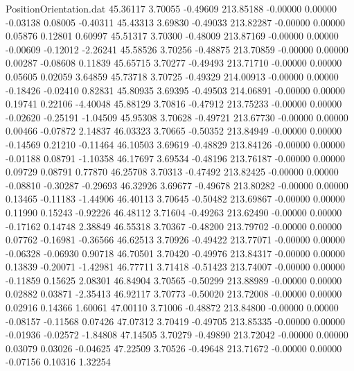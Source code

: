 \begin{filecontents}{PositionOrientation.dat}
  45.36117    3.70055   -0.49609   213.85188   -0.00000    0.00000   -0.03138    0.08005   -0.40311
  45.43313    3.69830   -0.49033   213.82287   -0.00000    0.00000    0.05876    0.12801    0.60997
  45.51317    3.70300   -0.48009   213.87169   -0.00000    0.00000   -0.00609   -0.12012   -2.26241
  45.58526    3.70256   -0.48875   213.70859   -0.00000    0.00000    0.00287   -0.08608    0.11839
  45.65715    3.70277   -0.49493   213.71710   -0.00000    0.00000    0.05605    0.02059    3.64859
  45.73718    3.70725   -0.49329   214.00913   -0.00000    0.00000   -0.18426   -0.02410    0.82831
  45.80935    3.69395   -0.49503   214.06891   -0.00000    0.00000    0.19741    0.22106   -4.40048
  45.88129    3.70816   -0.47912   213.75233   -0.00000    0.00000   -0.02620   -0.25191   -1.04509
  45.95308    3.70628   -0.49721   213.67730   -0.00000    0.00000    0.00466   -0.07872    2.14837
  46.03323    3.70665   -0.50352   213.84949   -0.00000    0.00000   -0.14569    0.21210   -0.11464
  46.10503    3.69619   -0.48829   213.84126   -0.00000    0.00000   -0.01188    0.08791   -1.10358
  46.17697    3.69534   -0.48196   213.76187   -0.00000    0.00000    0.09729    0.08791    0.77870
  46.25708    3.70313   -0.47492   213.82425   -0.00000    0.00000   -0.08810   -0.30287   -0.29693
  46.32926    3.69677   -0.49678   213.80282   -0.00000    0.00000    0.13465   -0.11183   -1.44906
  46.40113    3.70645   -0.50482   213.69867   -0.00000    0.00000    0.11990    0.15243   -0.92226
  46.48112    3.71604   -0.49263   213.62490   -0.00000    0.00000   -0.17162    0.14748    2.38849
  46.55318    3.70367   -0.48200   213.79702   -0.00000    0.00000    0.07762   -0.16981   -0.36566
  46.62513    3.70926   -0.49422   213.77071   -0.00000    0.00000   -0.06328   -0.06930    0.90718
  46.70501    3.70420   -0.49976   213.84317   -0.00000    0.00000    0.13839   -0.20071   -1.42981
  46.77711    3.71418   -0.51423   213.74007   -0.00000    0.00000   -0.11859    0.15625    2.08301
  46.84904    3.70565   -0.50299   213.88989   -0.00000    0.00000    0.02882    0.03871   -2.35413
  46.92117    3.70773   -0.50020   213.72008   -0.00000    0.00000    0.02916    0.14366    1.60061
  47.00110    3.71006   -0.48872   213.84800   -0.00000    0.00000   -0.08157   -0.11568    0.07426
  47.07312    3.70419   -0.49705   213.85335   -0.00000    0.00000   -0.01936   -0.02572   -1.84808
  47.14505    3.70279   -0.49890   213.72042   -0.00000    0.00000    0.03079    0.03026   -0.04625
  47.22509    3.70526   -0.49648   213.71672   -0.00000    0.00000   -0.07156    0.10316    1.32254

\end{filecontents}
